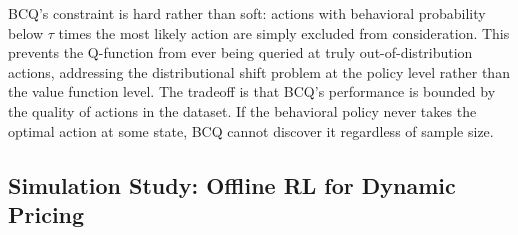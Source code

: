 BCQ's constraint is hard rather than soft: actions with behavioral probability below $\tau$ times the most likely action are simply excluded from consideration. This prevents the Q-function from ever being queried at truly out-of-distribution actions, addressing the distributional shift problem at the policy level rather than the value function level. The tradeoff is that BCQ's performance is bounded by the quality of actions in the dataset. If the behavioral policy never takes the optimal action at some state, BCQ cannot discover it regardless of sample size.

\subsection{Simulation Study: Offline RL for Dynamic Pricing}
\label{sec:offline_sim}

